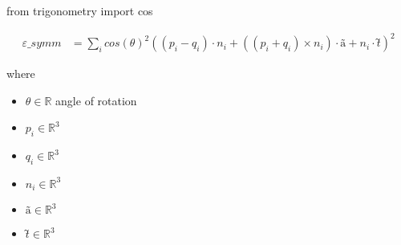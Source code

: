 \documentclass[12pt]{article}
\begin{document}
from trigonometry import cos

\begin{align*}
\textit{ε\_symm} & = \sum_\textit{i} cos\left( \textit{θ} \right)^{2}\left( \left( \textit{p}_{ \textit{i} } - \textit{q}_{ \textit{i} } \right) \cdot \textit{n}_{ \textit{i} } + \left( \left( \textit{p}_{ \textit{i} } + \textit{q}_{ \textit{i} } \right) × \textit{n}_{ \textit{i} } \right) \cdot \textit{ã} + \textit{n}_{ \textit{i} } \cdot \textit{t̃} \right)^{2}
\end{align*}

where
\begin{itemize}
\item $\textit{θ} \in \mathbb{{R}}$ angle of rotation
\item $\textit{p}_{\textit{i}} \in \mathbb{R}^{ 3}$
\item $\textit{q}_{\textit{i}} \in \mathbb{R}^{ 3}$
\item $\textit{n}_{\textit{i}} \in \mathbb{R}^{ 3}$
\item $\textit{ã} \in \mathbb{R}^{ 3}$
\item $\textit{t̃} \in \mathbb{R}^{ 3}$
\end{itemize}
\end{document}
